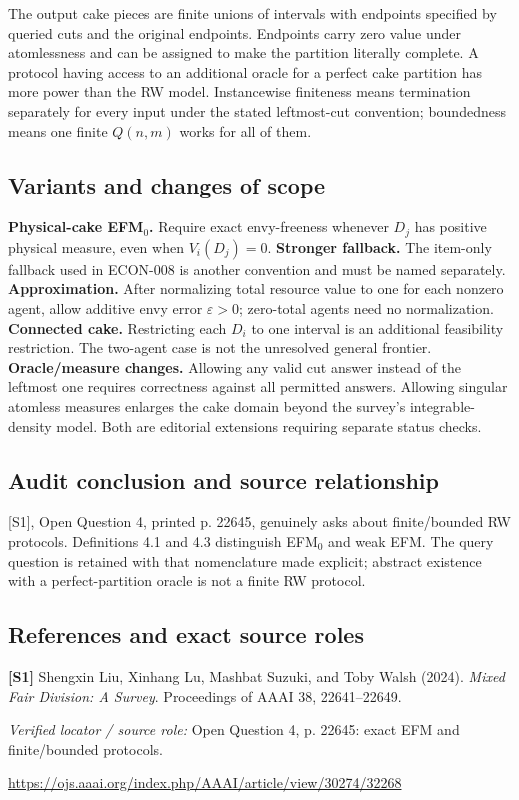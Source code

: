 \documentclass[11pt,a4paper]{article}
\begin{document}
The output cake pieces are finite unions of intervals with endpoints specified by queried cuts and the original endpoints. Endpoints carry zero value under atomlessness and can be assigned to make the partition literally complete. A protocol having access to an additional oracle for a perfect cake partition has more power than the RW model. Instancewise finiteness means termination separately for every input under the stated leftmost-cut convention; boundedness means one finite $Q(n,m)$ works for all of them.

\subsection*{Variants and changes of scope}

\textbf{Physical-cake EFM$_0$.} Require exact envy-freeness whenever $D_j$ has positive physical measure, even when $V_i(D_j)=0$. \textbf{Stronger fallback.} The item-only fallback used in ECON-008 is another convention and must be named separately. \textbf{Approximation.} After normalizing total resource value to one for each nonzero agent, allow additive envy error $\varepsilon>0$; zero-total agents need no normalization. \textbf{Connected cake.} Restricting each $D_i$ to one interval is an additional feasibility restriction. The two-agent case is not the unresolved general frontier. \textbf{Oracle/measure changes.} Allowing any valid cut answer instead of the leftmost one requires correctness against all permitted answers. Allowing singular atomless measures enlarges the cake domain beyond the survey's integrable-density model. Both are editorial extensions requiring separate status checks.

\subsection*{Audit conclusion and source relationship}

[S1], Open Question 4, printed p. 22645, genuinely asks about finite/bounded RW protocols. Definitions 4.1 and 4.3 distinguish EFM$_0$ and weak EFM. The query question is retained with that nomenclature made explicit; abstract existence with a perfect-partition oracle is not a finite RW protocol.

\subsection*{References and exact source roles}

{\footnotesize\raggedright
\par\noindent\textbf{[S1]} Shengxin Liu, Xinhang Lu, Mashbat Suzuki, and Toby Walsh (2024). \emph{Mixed Fair Division: A Survey}. Proceedings of AAAI 38, 22641–22649.\par \textit{Verified locator / source role:} Open Question 4, p. 22645: exact EFM and finite/bounded protocols.\par \url{https://ojs.aaai.org/index.php/AAAI/article/view/30274/32268}\par\smallskip
}
\end{document}
